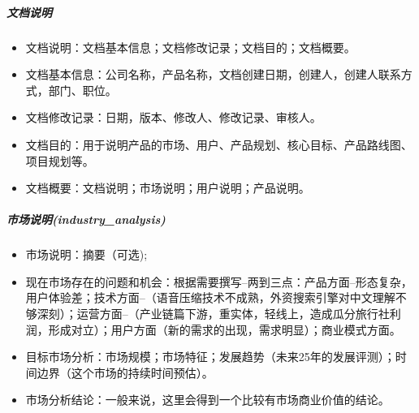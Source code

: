 \documentclass[letterpaper,11pt,english]{sphinxmanual}
\begin{document}
\subparagraph{文档说明}
\label{\detokenize{chapter_skill/MRD:id4}}\begin{itemize}
\item {} 
文档说明：文档基本信息；文档修改记录；文档目的；文档概要。

\item {} 
文档基本信息：公司名称，产品名称，文档创建日期，创建人，创建人联系方式，部门、职位。

\item {} 
文档修改记录：日期，版本、修改人、修改记录、审核人。

\item {} 
文档目的：用于说明产品的市场、用户、产品规划、核心目标、产品路线图、项目规划等。

\item {} 
文档概要：文档说明；市场说明；用户说明；产品说明。

\end{itemize}


\subparagraph{市场说明(industry\_analysis)}
\label{\detokenize{chapter_skill/MRD:industry-analysis}}\begin{itemize}
\item {} 
市场说明：摘要（可选);

\item {} 
现在市场存在的问题和机会：根据需要撰写–两到三点：产品方面–形态复杂，用户体验差；技术方面–（语音压缩技术不成熟，外资搜索引擎对中文理解不够深刻）；运营方面–（产业链篇下游，重实体，轻线上，造成瓜分旅行社利润，形成对立）；用户方面（新的需求的出现，需求明显）；商业模式方面。

\item {} 
目标市场分析：市场规模；市场特征；发展趋势（未来2\sphinxhyphen{}5年的发展评测）；时间边界（这个市场的持续时间预估）。

\item {} 
市场分析结论：一般来说，这里会得到一个比较有市场商业价值的结论。

\end{itemize}
\end{document}
